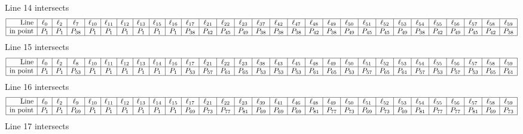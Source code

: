 \documentclass{article}
\begin{document}
{$$$$
Line 14 intersects 
$$
\begin{array}{|r*{28}{|c}|}
\hline
\mbox{Line}  & \ell_{0} & \ell_{2} & \ell_{7} & \ell_{10} & \ell_{11} & \ell_{12} & \ell_{13} & \ell_{15} & \ell_{16} & \ell_{17} & \ell_{21} & \ell_{22} & \ell_{23} & \ell_{37} & \ell_{42} & \ell_{47} & \ell_{48} & \ell_{49} & \ell_{50} & \ell_{51} & \ell_{52} & \ell_{53} & \ell_{54} & \ell_{55} & \ell_{56} & \ell_{57} & \ell_{58} & \ell_{59}\\
\hline
\mbox{in point}  & P_{1} & P_{1} & P_{38} & P_{1} & P_{1} & P_{1} & P_{1} & P_{1} & P_{1} & P_{38} & P_{42} & P_{45} & P_{49} & P_{38} & P_{38} & P_{38} & P_{42} & P_{38} & P_{49} & P_{45} & P_{45} & P_{49} & P_{38} & P_{42} & P_{49} & P_{45} & P_{42} & P_{38}\\
\hline
\end{array}
$$
Line 15 intersects 
$$
\begin{array}{|r*{28}{|c}|}
\hline
\mbox{Line}  & \ell_{0} & \ell_{2} & \ell_{8} & \ell_{10} & \ell_{11} & \ell_{12} & \ell_{13} & \ell_{14} & \ell_{16} & \ell_{17} & \ell_{21} & \ell_{22} & \ell_{23} & \ell_{38} & \ell_{43} & \ell_{45} & \ell_{48} & \ell_{49} & \ell_{50} & \ell_{51} & \ell_{52} & \ell_{53} & \ell_{54} & \ell_{55} & \ell_{56} & \ell_{57} & \ell_{58} & \ell_{59}\\
\hline
\mbox{in point}  & P_{1} & P_{1} & P_{53} & P_{1} & P_{1} & P_{1} & P_{1} & P_{1} & P_{1} & P_{53} & P_{57} & P_{61} & P_{65} & P_{53} & P_{53} & P_{53} & P_{61} & P_{65} & P_{53} & P_{57} & P_{65} & P_{61} & P_{57} & P_{53} & P_{57} & P_{53} & P_{65} & P_{61}\\
\hline
\end{array}
$$
Line 16 intersects 
$$
\begin{array}{|r*{28}{|c}|}
\hline
\mbox{Line}  & \ell_{0} & \ell_{2} & \ell_{9} & \ell_{10} & \ell_{11} & \ell_{12} & \ell_{13} & \ell_{14} & \ell_{15} & \ell_{17} & \ell_{21} & \ell_{22} & \ell_{23} & \ell_{39} & \ell_{41} & \ell_{46} & \ell_{48} & \ell_{49} & \ell_{50} & \ell_{51} & \ell_{52} & \ell_{53} & \ell_{54} & \ell_{55} & \ell_{56} & \ell_{57} & \ell_{58} & \ell_{59}\\
\hline
\mbox{in point}  & P_{1} & P_{1} & P_{69} & P_{1} & P_{1} & P_{1} & P_{1} & P_{1} & P_{1} & P_{69} & P_{73} & P_{77} & P_{81} & P_{69} & P_{69} & P_{69} & P_{81} & P_{77} & P_{73} & P_{69} & P_{73} & P_{69} & P_{81} & P_{77} & P_{77} & P_{81} & P_{69} & P_{73}\\
\hline
\end{array}
$$
Line 17 intersects 
$$
$$}
\end{document}
